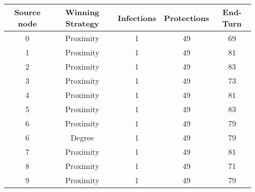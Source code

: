 \documentclass[results.tex]{subfiles}
\begin{document}
    \begin{center}
        \begin{tabular}{| c || c | c | c | c |}
            \hline
            {\bfseries Source node} & {\bfseries Winning Strategy} & {\bfseries Infections} & {\bfseries Protections}
            & {\bfseries End-Turn}
            \\  %
            \hline\hline
            0                       & Proximity                    & 1                      & 49                      & 69                   \\
            \hline
            1                       & Proximity                    & 1                      & 49                      & 81                   \\
            \hline
            2                       & Proximity                    & 1                      & 49                      & 83                   \\
            \hline
            3                       & Proximity                    & 1                      & 49                      & 73                   \\
            \hline
            4                       & Proximity                    & 1                      & 49                      & 81                   \\
            \hline
            5                       & Proximity                    & 1                      & 49                      & 83                   \\
            \hline
            6                       & Proximity                    & 1                      & 49                      & 79                   \\
            \hline
            6                       & Degree                       & 1                      & 49                      & 79                   \\
            \hline
            7                       & Proximity                    & 1                      & 49                      & 81                   \\
            \hline
            8                       & Proximity                    & 1                      & 49                      & 71                   \\
            \hline
            9                       & Proximity                    & 1                      & 49                      & 79                   \\

\end{tabular}
\end{center}
\end{document}
